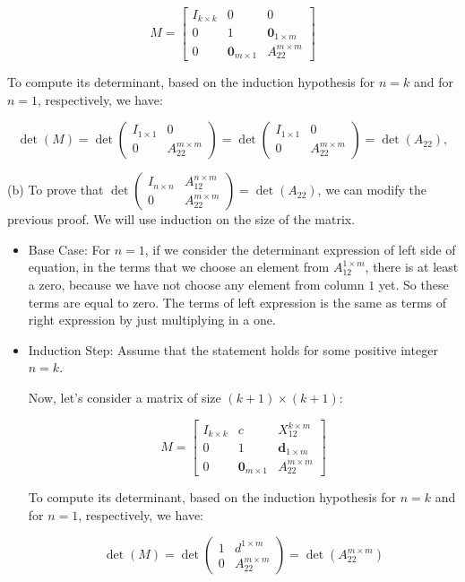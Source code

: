 \documentclass[12pt]{article}
\begin{document}
\begin{enumerate}[leftmargin=\labelsep]
\begin{itemize}
$$
M = \begin{bmatrix}
I_{k\times k} & 0 & 0 \\
0 & 1 & \mathbf{0}_{1\times m} \\
0 & \mathbf{0}_{m\times 1} & A_{22}^{m\times m}
\end{bmatrix}
$$

To compute its determinant, based on the induction hypothesis for $n = k$ and for $n = 1$, respectively, we have:

$$
\det(M) = \det(\begin{matrix}I_{1\times 1} & 0 \\ 0 & A_{22}^{m\times m}\end{matrix}) = \det(\begin{matrix}I_{1\times 1} & 0 \\ 0 & A_{22}^{m\times m}\end{matrix}) =\det(A_{22}) ,
$$
\end{itemize}

(b) To prove that $\det\left(\begin{matrix}I_{n\times n} & A_{12}^{n\times m} \\ 0 & A_{22}^{m\times m}\end{matrix}\right) = \det(A_{22})$, we can modify the previous proof. We will use induction on the size of the matrix. 
\begin{itemize}
\item Base Case: For $n = 1$, if we consider the determinant expression of left side of equation, in the terms that we choose an element from $A^{1 \times {m}}_{12}$, there is at least a zero, because we have not choose any element from column $1$ yet. So these terms are equal to zero. The terms of left expression is the same as terms of right expression by just multiplying in a one.

\item Induction Step: Assume that the statement holds for some positive integer $n = k$.

Now, let's consider a matrix of size $(k+1)\times (k+1)$:

$$
M = \begin{bmatrix}
I_{k\times k} & c & X_{12}^{k\times m}\\
0 & 1 & \mathbf{d}_{1\times m} \\
0 & \mathbf{0}_{m\times 1} & A_{22}^{m\times m}
\end{bmatrix}
$$

To compute its determinant, based on the induction hypothesis for $n = k$ and for $n = 1$, respectively, we have:

$$
\det(M) = \det\left(\begin{matrix}1 & d^{1\times m} \\ 0 & A_{22}^{m\times m}\end{matrix}\right) = \det(A_{22}^{m\times m})
$$
\end{itemize}
\end{enumerate}
\end{document}
